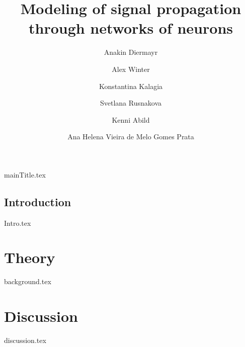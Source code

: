 \documentclass[printGloss, printBibble]{myRUCProject}
\title{Modeling of signal propagation through networks of neurons}
\author{ Anakin Diermayr \and  Alex Winter \and Konstantina Kalagia \and Svetlana Rusnakova \and Kenni Abild \and  Ana Helena Vieira de Melo Gomes Prata }
\begin{document}


{mainTitle.tex}


{%
\setlength{\parskip}{0.5ex} %
\tableofcontents%

\printacronyms%
}










\newpage
{}
\chapter*{Introduction} 
{Intro.tex}

\part{Theory}

{background.tex}







\newpage
\part{Discussion}
{discussion.tex}
\end{document}
